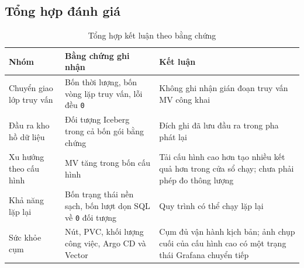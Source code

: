 \subsection{Tổng hợp đánh giá}
\begin{table}[H]
\centering
\caption{Tổng hợp kết luận theo bằng chứng}
\begin{tabularx}{\textwidth}{@{}p{}p{}Y@{}}
\toprule
\textbf{Nhóm} & \textbf{Bằng chứng ghi nhận} & \textbf{Kết luận}\\
\midrule
Chuyển giao lớp truy vấn & Bốn thời lượng, bốn vòng lặp truy vấn, lỗi đều \texttt{0} & Không ghi nhận gián đoạn truy vấn MV công khai\\
Đầu ra kho hồ dữ liệu & Đối tượng Iceberg trong cả bốn gói bằng chứng & Đích ghi đã lưu đầu ra trong pha phát lại\\
Xu hướng theo cấu hình & MV tăng trong bốn cấu hình & Tải cấu hình cao hơn tạo nhiều kết quả hơn trong cửa sổ chạy; chưa phải phép đo thông lượng\\
Khả năng lặp lại & Bốn trạng thái nền sạch, bốn lượt dọn SQL về \texttt{0} đối tượng & Quy trình có thể chạy lặp lại\\
Sức khỏe cụm & Nút, PVC, khối lượng công việc, Argo CD và Vector & Cụm đủ vận hành kịch bản; ảnh chụp cuối của cấu hình cao có một trạng thái Grafana chuyển tiếp\\
\bottomrule
\end{tabularx}
\end{table}
